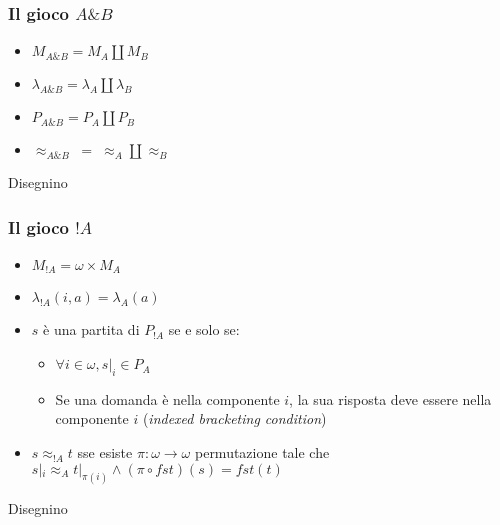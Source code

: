 \documentclass{beamer}
\begin{document}
\begin{frame}
	
	\frametitle{Il gioco $A \& B$}
	
	\begin{itemize}
		\item $M_{A\& B}=M_A \coprod M_B$
		\item $\lambda_{A\& B}=\lambda_A \coprod \lambda_B$
		\item $P_{A\& B}=P_A \coprod P_B$
		\item $\approx_{A\& B} \; = \; \approx_A \coprod \approx_B$ 
	\end{itemize}
	
	Disegnino
	
\end{frame}

\begin{frame}
	
	\frametitle{Il gioco $!A$}
	
	\begin{itemize}
		\item $M_{!A}=\omega \times M_A$
		\item $\lambda_{!A}(i,a)=\lambda_A(a)$
		\item $s$ è una partita di $P_{!A}$ se e solo se:
		\begin{itemize}
			\item $\forall i\in \omega , s|_i \in P_A$
			\item Se una domanda è nella componente $i$, la sua risposta deve essere nella componente $i$ (\emph{indexed bracketing condition})
		\end{itemize}

		\item $s\approx_{!A} t$ sse esiste $\pi:\omega \rightarrow \omega$ permutazione tale che $s|_i \approx_A t|_{\pi(i)} \wedge (\pi \circ fst)(s)=fst(t)$
	\end{itemize}
	
	Disegnino
	
\end{frame}
\end{document}
